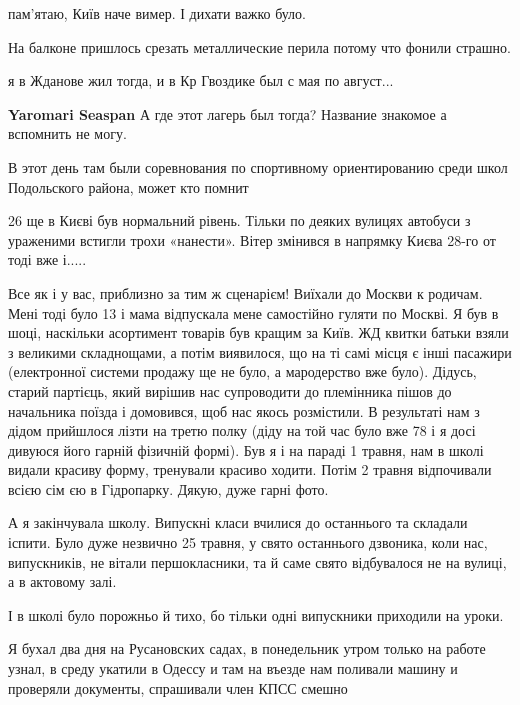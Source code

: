 \begin{itemize}
пам'ятаю, Київ наче вимер. І дихати важко було.

На балконе пришлось срезать металлические перила потому что фонили страшно.

я в Жданове жил тогда, и в Кр Гвоздике был с мая по август...

\begin{itemize} %
\textbf{Yaromari Seaspan} А где этот лагерь был тогда? Название знакомое а вспомнить не могу.
\end{itemize} %

В этот день там были соревнования по спортивному ориентированию среди школ Подольского района, может кто помнит


26 ще в Києві був нормальний рівень. Тільки по деяких вулицях автобуси з
ураженими встигли трохи «нанести». Вітер змінився в напрямку Києва 28-го от
тоді вже і.....



Все як і у вас, приблизно за тим ж сценарієм! Виїхали до Москви к родичам. Мені
тоді було 13 і мама відпускала мене самостійно гуляти по Москві. Я був в шоці,
наскільки асортимент товарів був кращим за Київ. ЖД квитки батьки взяли з
великими складнощами, а потім виявилося, що на ті самі місця є інші пасажири
(електронної системи продажу ще не було, а мародерство вже було). Дідусь,
старий партієць, який вирішив нас супроводити до племінника пішов до начальника
поїзда і домовився, щоб нас якось розмістили. В результаті нам з дідом
прийшлося лізти на третю полку (діду на той час було вже 78 і я досі дивуюся
його гарній фізичній формі). Був я і на параді 1 травня, нам в школі видали
красиву форму, тренували красиво ходити. Потім 2 травня відпочивали всією сім
єю в Гідропарку. Дякую, дуже гарні фото.


А я закінчувала школу. Випускні класи вчилися до останнього та складали іспити.
Було дуже незвично 25 травня, у свято останнього дзвоника, коли нас,
випускників, не вітали першокласники, та й саме свято відбувалося не на вулиці,
а в актовому залі.

І в школі було порожньо й тихо, бо тільки одні випускники приходили на уроки.



Я бухал два дня на Русановских садах, в понедельник утром только на работе
узнал, в среду укатили в Одессу и там на въезде нам поливали машину и проверяли
документы, спрашивали член КПСС смешно



\end{itemize}
